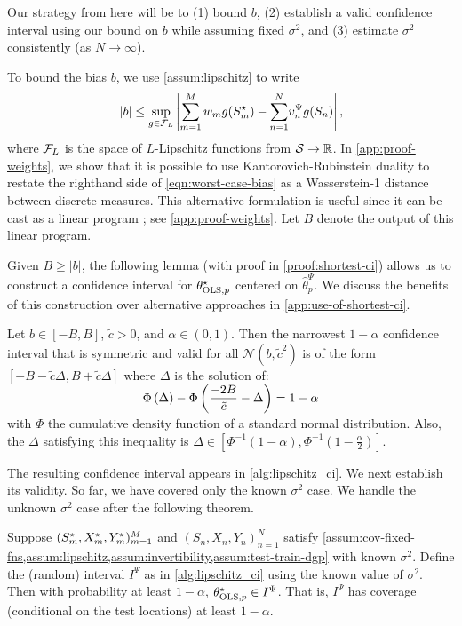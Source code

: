 Our strategy from here will be to (1) bound $b$, (2) establish a valid confidence interval using our bound on $b$ while assuming fixed $\sigma^2$, and (3) estimate $\sigma^2$ consistently (as $N\rightarrow\infty$).

To bound the bias $b$, we use \cref{assum:lipschitz} to write 
\begin{align}
    |b| \leq \sup_{g \in \mathcal{F}_L} \left|\sum_{m=1}^M w_m g(S^{\star}_m) -\sum_{n=1}^N \!v^{\Psi}_n g(S_n)\right|,\! \label{eqn:worst-case-bias}
\end{align}
where $\mathcal{F}_L$ is the space of $L$-Lipschitz functions from $\mathcal{S} \to \mathbb{R}$. In \cref{app:proof-weights}, we show that it is possible to use Kantorovich-Rubinstein duality to restate the righthand side of \cref{eqn:worst-case-bias} as a Wasserstein-1 distance between discrete measures. This alternative formulation is useful since it can be cast as a linear program \citep[Chapter 3]{peyre_computational_2019}; see \cref{app:proof-weights}. Let $B$ denote the output of this linear program.

Given $B \ge |b|$, the following lemma (with proof in \cref{proof:shortest-ci}) allows us to construct a confidence interval for $\theta^{\star}_{\text{OLS},p}$ centered on $\hat{\theta}_p^{\Psi}$. We discuss the benefits of this construction over alternative approaches in \cref{app:use-of-shortest-ci}.
\begin{lemma}\label{lem:shortest-ci}
    Let $b \in [-B, B]$, $\tilde{c} > 0$, and $\alpha \in (0,1)$. Then the narrowest $1-\alpha$ confidence interval that is symmetric and valid for all $\mathcal{N}(b, \tilde{c}^2)$ is of the form $[-B-\tilde{c}\Delta, B+\tilde{c}\Delta]$
     where $\Delta$ is the solution of:
    \begin{align} \label{eqn:root-finding-ci}
        \smash{\Phi\left(\Delta\right) - \Phi\left(\frac{-2B}{\tilde{c}}-\Delta\right) = 1 - \alpha}
    \end{align}
    with $\Phi$ the cumulative density function of a standard normal distribution. Also, the $\Delta$ satisfying this inequality is $\Delta \in [\Phi^{-1}(1-\alpha), \Phi^{-1}(1-\frac{\alpha}{2})]$.
\end{lemma}

The resulting confidence interval appears in \cref{alg:lipschitz_ci}. We next establish its validity. So far, we have covered only the known $\sigma^2$ case. We handle the unknown $\sigma^2$ case after the following theorem.
\begin{theorem}
    \label{thm:ci}
    Suppose $(S^{\star}_m, X^{\star}_m, Y^{\star}_m)_{m=1}^M$ and $(S_n, X_n, Y_n)_{n=1}^N$ satisfy \cref{assum:cov-fixed-fns,assum:lipschitz,assum:invertibility,assum:test-train-dgp} with known $\sigma^2$. Define the (random) interval $I^{\Psi}$ as in  \cref{alg:lipschitz_ci} using the known value of $\sigma^2$.
    Then with probability at least $1-\alpha$, $\theta^{\star}_{\text{OLS},p} \in I^{\Psi}$. That is, $I^{\Psi}$ has coverage (conditional on the test locations) at least $1-\alpha$. 
\end{theorem}

